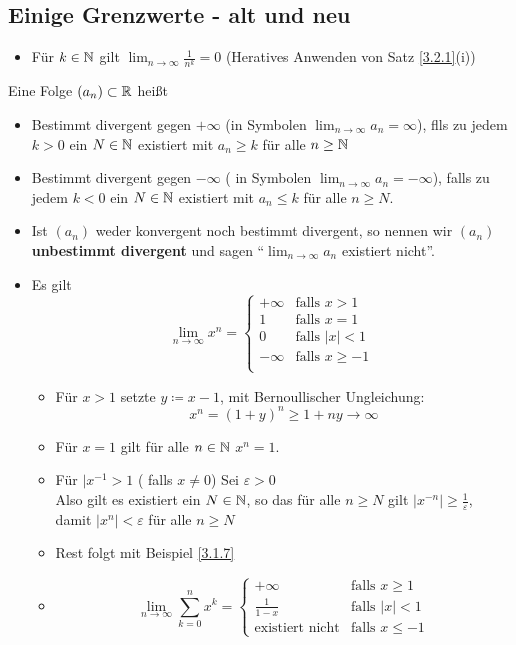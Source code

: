 \subsection{Einige Grenzwerte - alt und neu}
\begin{itemize}
	\item Für $ k \in \mathbb{N} $ gilt $ \lim_{n\to\infty} \frac{1}{n^k} = 0 $ (Heratives Anwenden von Satz \ref{3.2.1}(i))
\end{itemize}
\begin{subdefinition}
	Eine Folge $ (a_n)\subset \mathbb{R} $ heißt
	\begin{itemize}
		\item Bestimmt divergent gegen $+\infty$ (in Symbolen $ \lim_{n\to\infty} a_n = \infty $), flls zu jedem $ k > 0 $ ein $ N \in \mathbb{N} $ existiert mit $ a_n \geq k $ für alle $ n \geq \mathbb{N} $
		\item Bestimmt divergent gegen $ - \infty $ ( in Symbolen $ \lim_{n\to\infty} a_n = -\infty $), falls zu jedem $ k < 0 $ ein $ N \in \mathbb{N} $ existiert mit $ a_n \leq k $ für alle $ n \geq N $.
		\item Ist $ (a_n) $ weder konvergent noch bestimmt divergent, so nennen wir $ (a_n) $ \textbf{unbestimmt divergent} und sagen ``$\lim_{n\to\infty} a_n$ existiert nicht''.
	\end{itemize}
\end{subdefinition}

\begin{itemize}
	\item Es gilt
		\[ \lim_{n\to\infty} x^n =
		\begin{cases}
			+\infty	& \text{falls } x > 1\\
			1	& \text{falls } x = 1\\
			0	& \text{falls } |x| < 1\\
			-\infty	& \text{falls } x \geq -1\\
		\end{cases}
		\]
		\begin{itemize}
			\item Für $ x > 1 $ setzte $ y \coloneqq x - 1$, mit Bernoullischer Ungleichung:
				\[ x^n = (1+y)^n \geq 1 + ny \to\infty \]
			\item Für $ x = 1 $ gilt für alle $ n \in \mathbb{N} $ $ x^n = 1 $.
			\item Für $ |x^{-1} > 1 $ ( falls $ x \neq 0 $) Sei $ \varepsilon > 0 $\\
				Also gilt es existiert ein $ N \in \mathbb{N} $, so das für alle $ n \geq N $ gilt $ | x^{-n} | \geq \frac{1}{\varepsilon} $, damit $ |x^n| < \varepsilon $ für alle $ n \geq N $
			\item Rest folgt mit Beispiel \ref{3.1.7}
			\item \[ \lim_{n\to\infty} \sum_{k=0}^n x^k =
				\begin{cases}
					+\infty			& \text{falls } x \geq 1\\
					\frac{1}{1-x} 		& \text{falls } |x| < 1\\
					\text{existiert nicht}	& \text{falls } x \leq -1
				\end{cases}
				\]
		\end{itemize}
\end{itemize}

